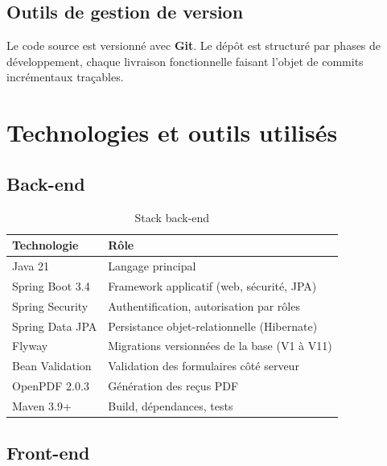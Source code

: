 \documentclass[11pt,a4paper,oneside]{report}
\begin{document}
\subsection{Outils de gestion de version}

Le code source est versionné avec \textbf{Git}. Le dépôt est structuré par phases de développement, chaque livraison fonctionnelle faisant l'objet de commits incrémentaux traçables.

\section{Technologies et outils utilisés}

\subsection{Back-end}

\begin{table}[H]
    \centering
    \caption{Stack back-end}
    \label{tab:stack-backend}
    \begin{tabular}{@{}lp{9cm}@{}}
        \rowcolor{AmanaBrown}
        \color{white}\textbf{Technologie} & \textbf{Rôle} \\
        \midrule
        Java 21 & Langage principal \\
        Spring Boot 3.4 & Framework applicatif (web, sécurité, JPA) \\
        Spring Security & Authentification, autorisation par rôles \\
        Spring Data JPA & Persistance objet-relationnelle (Hibernate) \\
        Flyway & Migrations versionnées de la base (V1 à V11) \\
        Bean Validation & Validation des formulaires côté serveur \\
        OpenPDF 2.0.3 & Génération des reçus PDF \\
        Maven 3.9+ & Build, dépendances, tests \\
        \bottomrule
    \end{tabular}
\end{table}

\subsection{Front-end}
\end{document}
